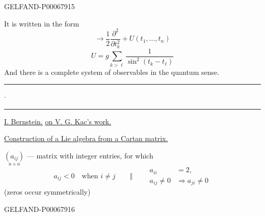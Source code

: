 \begin{GelfandAdjacentEvidence}{GELFAND-P000679}{15}

It is written in the form
\[
\longrightarrow\frac12\frac{\partial^2}{\partial t_k^2}
 +U(t_1,\ldots,t_n)
\]
\[
U=g\sum_{k>\ell}\frac1{\sin^2(t_k-t_\ell)}
\]
And there is a complete system of observables in the quantum sense.

\noindent\rule{14mm}{.45pt}\enspace\(\cdot\)\enspace\rule{15mm}{.45pt}

\underline{\underline{I. Bernstein.}}\qquad
\underline{\underline{on V. G. Kac’s work.}}

\underline{Construction of a Lie algebra from a Cartan matrix.}

\(\underset{n\times n}{(a_{ij})}\) --- matrix with integer entries, for which
\[
a_{ij}<0\quad\text{when }i\ne j
\qquad\Vert\qquad
\begin{aligned}
a_{ii}&=2,\\
a_{ij}\ne0&\Rightarrow a_{ji}\ne0
\end{aligned}
\]
(zeros occur symmetrically)
\end{GelfandAdjacentEvidence}
\begin{GelfandAdjacentEvidence}{GELFAND-P000679}{16}

\end{GelfandAdjacentEvidence}



